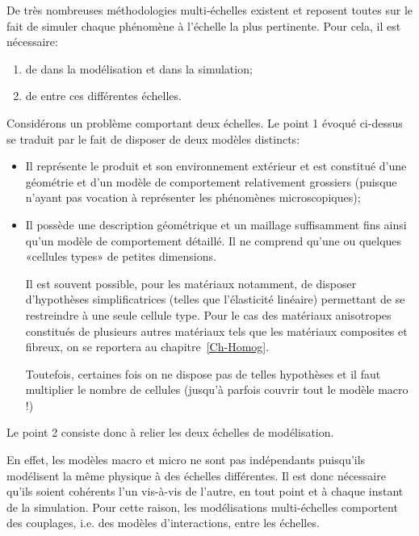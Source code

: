 \medskip
De très nombreuses méthodologies multi-échelles existent et reposent toutes sur le fait de simuler chaque phénomène à l'échelle la plus pertinente. Pour cela, il est nécessaire:
\begin{enumerate}
  \item de  dans la modélisation et dans la simulation;
  \item de  entre ces différentes échelles.
\end{enumerate}

\medskip
Considérons un problème comportant deux échelles. Le point 1 évoqué ci-dessus se traduit par le fait de disposer de deux modèles distincts:
\begin{itemize}
  \item {}

	Il représente le produit et son environnement extérieur et est constitué
	d'une géométrie et d'un modèle de comportement relativement grossiers
	(puisque n'ayant pas vocation à représenter les phénomènes microscopiques);
  \item {}

	Il possède une description géométrique et un maillage suffisamment fins ainsi qu'un
	modèle de comportement détaillé. Il ne comprend qu'une ou quelques
	«cellules types» de petites dimensions.

	Il est souvent possible, pour les matériaux notamment, de disposer d'hypothèses
	simplificatrices (telles que l'élasticité linéaire) permettant de se restreindre à une
	seule cellule type.
	Pour le cas des matériaux anisotropes constitués de plusieurs autres matériaux tels
	que les matériaux composites et fibreux, on se reportera au chapitre~\ref{Ch-Homog}. 

	Toutefois, certaines fois on ne dispose pas de telles hypothèses et il faut multiplier le nombre de cellules (jusqu'à parfois couvrir tout le modèle macro !)
\end{itemize}

\medskip
Le point 2 consiste donc à relier les deux échelles de modélisation.

En effet, les modèles macro et micro ne sont pas indépendants puisqu'ils modélisent la même physique à des échelles différentes. Il est donc nécessaire qu'ils soient cohérents l'un vis-à-vis de l'autre, en tout point et à chaque instant de la simulation. Pour cette raison, les modélisations multi-échelles comportent des couplages, i.e. des modèles d'interactions, entre les échelles.

